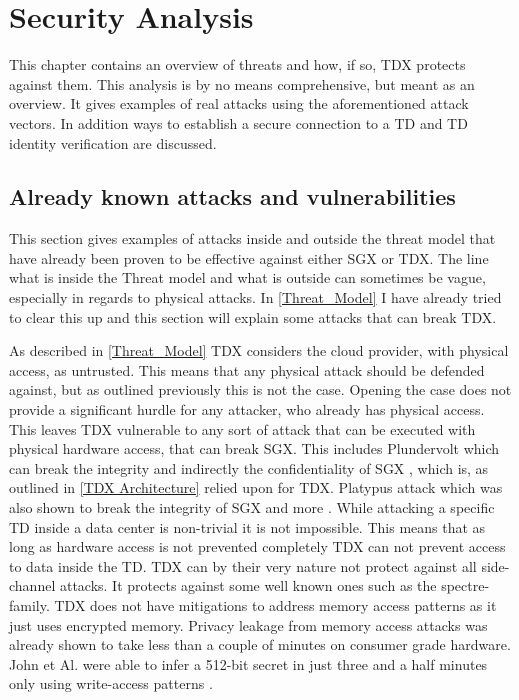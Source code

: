 
\chapter{Security Analysis}
\label{Security Analysis}

This chapter contains an overview of threats and how, if so, TDX protects against them. This analysis is by no means comprehensive, but meant as an overview. It gives examples of real attacks using the aforementioned attack vectors. In addition ways to establish a secure connection to a TD and TD identity verification are discussed.

\section{Already known attacks and vulnerabilities}

This section gives examples of attacks inside and outside the threat model that have already been proven to be effective against either SGX or TDX. The line what is inside the Threat model and what is outside can sometimes be vague, especially in regards to physical attacks. In \cref{Threat_Model} I have already tried to clear this up and this section will explain some attacks that can break TDX.

As described in \cref{Threat_Model} TDX considers the cloud provider, with physical access, as untrusted. This means that any physical attack should be defended against, but as outlined previously this is not the case. Opening the case does not provide a significant hurdle for any attacker, who already has physical access. This leaves TDX vulnerable to any sort of attack that can be executed with physical hardware access, that can break SGX. This includes Plundervolt which can break the integrity and indirectly the confidentiality of SGX \cite{munoz_survey_2023}, which is, as outlined in \cref{TDX Architecture} relied upon for TDX. Platypus attack which was also shown to break the integrity of SGX \cite{Lipp2021Platypus} and more \cite{lipp_nethammer_2018} \cite{tang_clkscrew_nodate}. While attacking a specific TD inside a data center is non-trivial it is not impossible. This means that as long as hardware access is not prevented completely TDX can not prevent access to data inside the TD. TDX can by their very nature not protect against all side-channel attacks. It protects against some well known ones such as the spectre-family. TDX does not have mitigations to address memory access patterns as it just uses encrypted memory. Privacy leakage from memory access attacks was already shown to take less than a couple of minutes on consumer grade hardware. John et Al. were able to infer a 512-bit secret in just three and a half minutes only using write-access patterns \cite{john_connecting_2017}.



